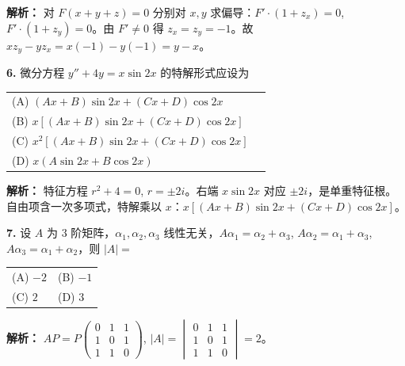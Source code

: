 \ifshowsolutions\par\noindent\textbf{解析：} 对 $F(x+y+z)=0$ 分别对 $x,y$ 求偏导：$F'\cdot(1+z_x)=0$, $F'\cdot(1+z_y)=0$。由 $F'\neq0$ 得 $z_x=z_y=-1$。故 $xz_y-yz_x = x(-1)-y(-1)=y-x$。\else \answerarea \fi

\vspace{8pt}

\textbf{6.} 微分方程 $y'' + 4y = x\sin 2x$ 的特解形式应设为
\begin{center}
\begin{tabular}{ll}
(A) $(Ax+B)\sin 2x + (Cx+D)\cos 2x$ \\[4pt]
(B) $x[(Ax+B)\sin 2x + (Cx+D)\cos 2x]$ \\[4pt]
(C) $x^2[(Ax+B)\sin 2x + (Cx+D)\cos 2x]$ \\[4pt]
(D) $x(A\sin 2x+B\cos 2x)$
\end{tabular}
\end{center}

\ifshowsolutions\par\noindent\textbf{解析：} 特征方程 $r^2+4=0$, $r=\pm2i$。右端 $x\sin2x$ 对应 $\pm2i$，是单重特征根。自由项含一次多项式，特解乘以 $x$：$x[(Ax+B)\sin2x+(Cx+D)\cos2x]$。\else \answerarea \fi

\vspace{8pt}

\textbf{7.} 设 $A$ 为 $3$ 阶矩阵，$\alpha_1,\alpha_2,\alpha_3$ 线性无关，$A\alpha_1=\alpha_2+\alpha_3$, $A\alpha_2=\alpha_1+\alpha_3$, $A\alpha_3=\alpha_1+\alpha_2$，则 $|A|=$
\begin{center}
\begin{tabular}{ll}
(A) $-2$ & (B) $-1$ \\[6pt]
(C) $2$ & (D) $3$
\end{tabular}
\end{center}

\ifshowsolutions\par\noindent\textbf{解析：} $AP = P\begin{pmatrix}0&1&1\\1&0&1\\1&1&0\end{pmatrix}$, $|A|=\begin{vmatrix}0&1&1\\1&0&1\\1&1&0\end{vmatrix}=2$。\else \answerarea \fi

\vspace{8pt}

